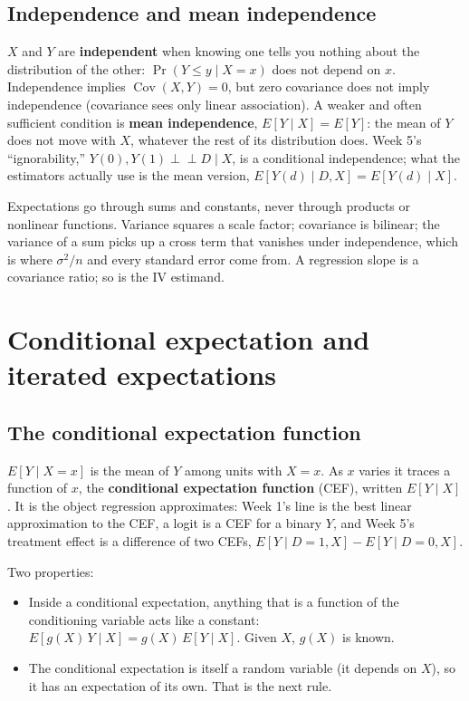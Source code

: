 \documentclass[11pt]{article}
\theoremstyle{definition}
\DeclareMathOperator{\Cov}{Cov}
\newcommand{\E}{E}
\begin{document}
\subsection{Independence and mean independence}

$X$ and $Y$ are \textbf{independent} when knowing one tells you nothing
about the distribution of the other: $\Pr(Y \le y \mid X = x)$ does not
depend on $x$. Independence implies $\Cov(X, Y) = 0$, but zero covariance
does not imply independence (covariance sees only linear association). A
weaker and often sufficient condition is \textbf{mean independence},
$\E[Y \mid X] = \E[Y]$: the mean of $Y$ does not move with $X$, whatever
the rest of its distribution does. Week 5's ``ignorability,''
$Y(0), Y(1) \perp\!\!\!\perp D \mid X$, is a conditional independence; what
the estimators actually use is the mean version,
$\E[Y(d) \mid D, X] = \E[Y(d) \mid X]$.

\begin{takeaway}
Expectations go through sums and constants, never through products or
nonlinear functions. Variance squares a scale factor; covariance is
bilinear; the variance of a sum picks up a cross term that vanishes under
independence, which is where $\sigma^2/n$ and every standard error come
from. A regression slope is a covariance ratio; so is the IV estimand.
\end{takeaway}

\section{Conditional expectation and iterated expectations}
\label{sec:condexp}

\subsection{The conditional expectation function}

$\E[Y \mid X = x]$ is the mean of $Y$ among units with $X = x$. As $x$
varies it traces a function of $x$, the \textbf{conditional expectation
function} (CEF), written $\E[Y \mid X]$. It is the object regression
approximates: Week 1's line is the best linear approximation to the CEF, a
logit is a CEF for a binary $Y$, and Week 5's treatment effect is a
difference of two CEFs, $\E[Y \mid D = 1, X] - \E[Y \mid D = 0, X]$.

Two properties:
\begin{itemize}
  \item Inside a conditional expectation, anything that is a function of
        the conditioning variable acts like a constant: $\E[g(X)\,Y \mid X]
        = g(X)\,\E[Y \mid X]$. Given $X$, $g(X)$ is known.
  \item The conditional expectation is itself a random variable (it
        depends on $X$), so it has an expectation of its own. That is the
        next rule.
\end{itemize}
\end{document}
